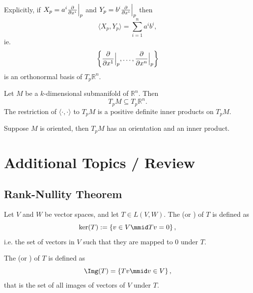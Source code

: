\documentclass[notoc,notitlepage]{tufte-book}
\begin{document}
Explicitly, if $X_p = a^i \frac{\partial}{\partial x^i} \Big|_{p}^{}$ and $Y_p = b^i
\frac{\partial}{\partial x^i}\Big|_{p}^{}$ then
\begin{equation*}
  \langle X_p, Y_p \rangle = \sum_{i=1}^{n} a^i b^i,
\end{equation*}
ie.
\begin{equation*}
  \left\{ \frac{\partial}{\partial x^1}\Big|_{p}^{}, \ldots,
  \frac{\partial}{\partial x^n}\Big|_{p}^{} \right\}
\end{equation*}
is an orthonormal basis of $T_p \mathbb{R}^n$.

Let $M$ be a $k$-dimensional submanifold of $\mathbb{R}^n$. Then
\begin{equation*}
  T_p M \subseteq T_p \mathbb{R}^n.
\end{equation*}
The restriction of $\langle \cdot, \cdot \rangle$ to $T_p M$ is a positive
definite inner products on $T_p M$.

Suppose $M$ is oriented, then $T_p M$ has an orientation and an inner product.




\appendix

\chapter{Additional Topics / Review}%
\label{chp:additional_topics_review}

\section{Rank-Nullity Theorem}%
\label{sec:rank_nullity_theorem}

\nocite{stephen2002}

\begin{defn}\label{defn:kernel_and_image}
  Let $V$ and $W$ be vector spaces, and let $T \in L(V, W)$.
  The  (or ) of $T$ is defined as
  \begin{equation*}
    \ker(T) := \left\{ v \in V \mmid Tv = 0 \right\},
  \end{equation*}
  i.e. the set of vectors in $V$ such that they are mapped to $0$ under $T$.

  The  (or ) of $T$ is defined as
  \begin{equation*}
    \Img(T) = \left\{ Tv \mmid v \in V \right\},
  \end{equation*}
  that is the set of all images of vectors of $V$ under $T$.
\end{defn}
\end{document}

